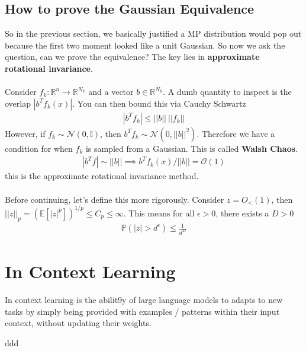 \subsection{How to prove the Gaussian Equivalence}
So in the previous section, we basically justified a MP distribution would pop out because the first two moment looked like a unit Gaussian.  So now we ask the question, can we prove the equivalence? The key lies in \textbf{approximate rotational invariance}.
\\
\\
Consider $f_k: \mathbb R^n \to \mathbb R^{N_k}$ and a vector $b \in \mathbb R^{N_k}$. A dumb quantity to inspect is the overlap $|b^T f_k(x)|$. You can then bound this via Cauchy Schwartz
\begin{align}
	|b^T f_k| \leq ||b|| ~ ||f_k||
\end{align}
However, if $f_k \sim \mathcal N(0, \mathbb I)$, then $b^T f_k \sim \mathcal N(0, ||b||^2)$. Therefore we have a condition for when $f_k$ is sampled from a Gaussian. This is called \textbf{Walsh Chaos}.
\begin{align}
	\boxed{|b^T f| \sim ||b||} \implies b^T f_k(x) / ||b|| = \mathcal O(1)
\end{align}
this is the approximate rotational invariance method. \\
\\
Before continuing, let's define this more rigorously. Consider $z = O_< (1)$, then $||z||_p = (\mathbb E[|z|^p])^{1/p} \leq C_p \leq \infty$. This means for all $\epsilon > 0$, there exists a $D >0$
\begin{align}
	\mathbb P(|z| >d^\epsilon ) \leq \frac{1}{d^D}
\end{align}


\section{In Context Learning}
\begin{definition}
	In context learning is the abilit9y of large language models to adapts to new tasks by simply being provided with examples / patterns within their input context, without updating their weights.
\end{definition}ddd




















